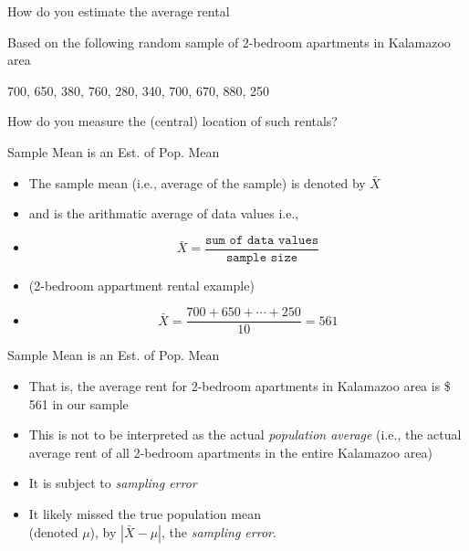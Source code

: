 \documentclass[14pt]{beamer}\usepackage[]{graphicx}\usepackage[]{color}
\begin{document}
\begin{frame}[fragile]{How do you estimate the average rental}

Based on the following random sample of 2-bedroom apartments in Kalamazoo area

\vspace{3mm}



  700, 650, 380, 760, 280, 340, 700, 670, 880, 250
  
\vspace{3mm}

  How do you measure the (central) location of such rentals?

\end{frame}

\begin{frame}[fragile]{Sample Mean is an Est. of Pop. Mean}

\begin{itemize}
\item<1-> The sample mean (i.e., average of the sample) is denoted by $\bar{X}$
\item<2-> and is the arithmatic average of data values  i.e.,
\item<3->
\begin{equation*}
\bar{X} = \frac{\texttt{sum of data values}}{\texttt{sample size}}
\end{equation*}
\item<4-> (2-bedroom appartment rental example)
\item<5->
\begin{equation*}
\bar{X} = \frac{700 + 650 + \cdots + 250}{10} = 561
\end{equation*}
\end{itemize}

\end{frame}
 
\begin{frame}[fragile]{Sample Mean is an Est. of Pop. Mean}

\begin{itemize}
\item<1-> That is, the average rent for 2-bedroom apartments in  Kalamazoo area is \$ 561 in our sample
\item<2-> This is not to be interpreted as the actual \textit{population average}  (i.e., the actual average rent of all 2-bedroom apartments in  the entire Kalamazoo area)
\item<3-> It is subject to \textit{sampling error}
\item<4-> It likely missed the true population mean \\ (denoted $\mu$), by $| \bar{X} - \mu |$,  the \textit{sampling error}.
\end{itemize}

\end{frame}
\end{document}
